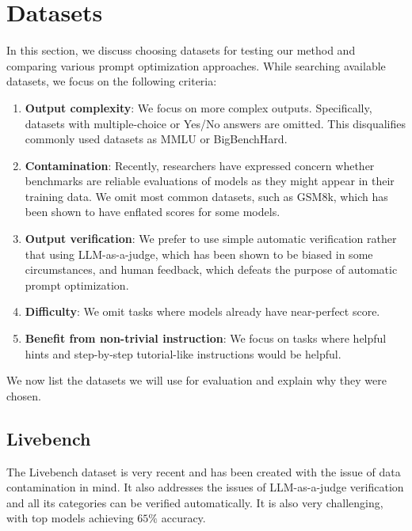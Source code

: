 \section{Datasets}
In this section, we discuss choosing datasets for testing our method and comparing various prompt optimization approaches. 
While searching available datasets, we focus on the following criteria:
\begin{enumerate}
    \item \textbf{Output complexity}: We focus on more complex outputs. Specifically, datasets with multiple-choice or Yes/No answers are omitted. 
    This disqualifies commonly used datasets as MMLU or BigBenchHard.
    \item \textbf{Contamination}: Recently, researchers have expressed concern\cite{white2025livebenchchallengingcontaminationlimitedllm} 
    whether benchmarks are reliable evaluations of models as they might appear in their training data. We omit most common datasets, such as GSM8k\cite{cobbe2021gsm8k}, which has been shown to have enflated scores for some models\cite{testing_language_models_on_a_held_out_high_school_national_finals_exam}.
    \item \textbf{Output verification}: We prefer to use simple automatic verification rather that using LLM-as-a-judge, which has been shown to be 
    biased in some circumstances\cite{ye2024justiceprejudicequantifyingbiases}, and human feedback, which defeats the purpose of automatic prompt optimization.
    \item \textbf{Difficulty}: We omit tasks where models already have near-perfect score. 
    \item \textbf{Benefit from non-trivial instruction}: We focus on tasks where helpful hints and step-by-step tutorial-like instructions would be helpful.
\end{enumerate}
We now list the datasets we will use for evaluation and explain why they were chosen.
\subsection{Livebench}
The Livebench\cite{white2025livebenchchallengingcontaminationlimitedllm} dataset is very recent and has been created with the issue of data contamination in mind.
It also addresses the issues of LLM-as-a-judge verification and all its categories can be verified automatically. It is also very challenging, with top models achieving $65\%$ accuracy\cite{white2025livebenchchallengingcontaminationlimitedllm}.

